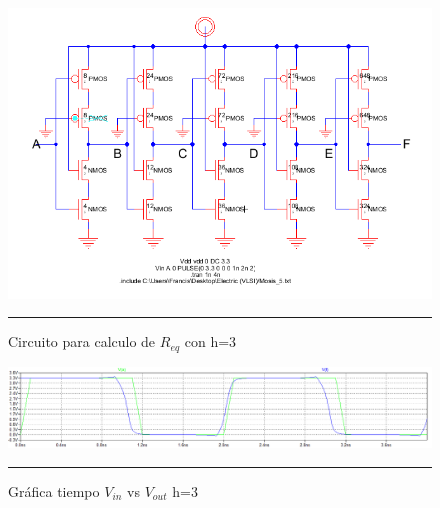 \documentclass[12pt,a4paper]{article} %
\begin{document}
\begin{figure}[htbp]
\begin{center}
    \includegraphics[scale=0.5]{./CircuitoFO3.png}
    \rule{35em}{0.5pt}
  \caption[Captura]{Circuito para calculo de $R_{eq}$ con h=3}
  \label{fig:CircuitoFO3}
  
\end{center}
\end{figure}

\begin{figure}[htbp]
  \begin{center}
    \includegraphics[scale=0.4]{./FO3.png}
    \rule{35em}{0.5pt}
  \caption[Captura]{Gráfica tiempo $V_{in}$ vs $V_{out}$ h=3}
  \label{fig:FO3}
  \end{center}
\end{figure}
\end{document}
